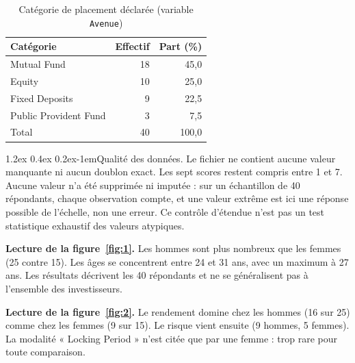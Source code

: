 \documentclass[11pt,a4paper]{article}
\makeatletter
\renewcommand\paragraph{\@startsection{paragraph}{4}{\z@}%
  {1.2ex \@plus 0.4ex \@minus 0.2ex}{-1em}{\normalfont\normalsize\bfseries}}
\makeatother
\begin{document}
\begin{table}[htbp]
  \centering
  \caption{Catégorie de placement déclarée (variable \texttt{Avenue})}
  \label{tab:avenue}
  \small
  \begin{tabular}{@{}l r r@{}}
    \toprule
    Catégorie & Effectif & Part (\%) \\
    \midrule
    Mutual Fund & 18 & 45,0 \\
    Equity & 10 & 25,0 \\
    Fixed Deposits & 9 & 22,5 \\
    Public Provident Fund & 3 & 7,5 \\
    \midrule
    Total & 40 & 100,0 \\
    \bottomrule
  \end{tabular}
\end{table}

\paragraph{Qualité des données.} Le fichier ne contient aucune valeur manquante ni aucun doublon exact. Les sept scores restent compris entre 1 et 7. Aucune valeur n'a été supprimée ni imputée : sur un échantillon de 40 répondants, chaque observation compte, et une valeur extrême est ici une réponse possible de l'échelle, non une erreur. Ce contrôle d'étendue n'est pas un test statistique exhaustif des valeurs atypiques.


\noindent\textbf{Lecture de la figure~\ref{fig:1}.} Les hommes sont plus nombreux que les femmes (25 contre 15). Les âges se concentrent entre 24 et 31 ans, avec un maximum à 27 ans. Les résultats décrivent les 40 répondants et ne se généralisent pas à l'ensemble des investisseurs.


\noindent\textbf{Lecture de la figure~\ref{fig:2}.} Le rendement domine chez les hommes (16 sur 25) comme chez les femmes (9 sur 15). Le risque vient ensuite (9 hommes, 5 femmes). La modalité « Locking Period » n'est citée que par une femme : trop rare pour toute comparaison.

\end{document}
